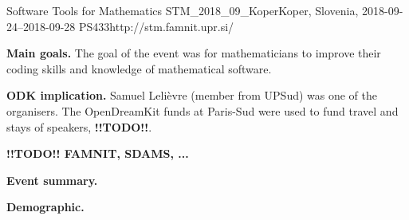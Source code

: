 \begin{event}{Software Tools for Mathematics}%
{STM_2018_09_Koper}{Koper, Slovenia, 2018-09-24--2018-09-28}%
{PS}{43}{3}{http://stm.famnit.upr.si/}

\textbf{Main goals.} The goal of the event was for mathematicians
to improve their coding skills and knowledge of mathematical software.

\textbf{ODK implication.} Samuel Lelièvre (\ODK member from UPSud) was one of
the organisers. The OpenDreamKit funds at Paris-Sud were used to fund travel
and stays of speakers, \textbf{!!TODO!!}.

\textbf{!!TODO!! FAMNIT, SDAMS, ...}

\textbf{Event summary.} 

\textbf{Demographic.} 


\end{event}
